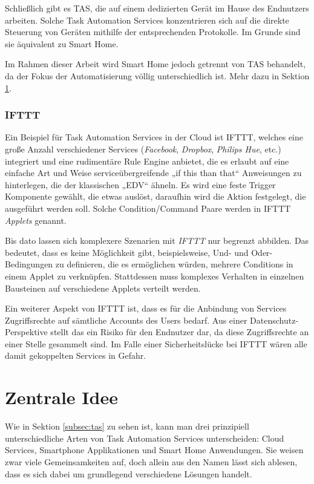 Schließlich gibt es TAS, die auf einem dedizierten Gerät im Hause des Endnutzers arbeiten. Solche Task Automation Services konzentrieren sich auf die direkte Steuerung von Geräten mithilfe der entsprechenden Protokolle. Im Grunde sind sie äquivalent zu Smart Home. 

Im Rahmen dieser Arbeit wird Smart Home jedoch getrennt von TAS behandelt, da der Fokus der Automatisierung völlig unterschiedlich ist. Mehr dazu in Sektion \ref{sec:idee}.



\subsubsection{IFTTT}
Ein Beispiel für Task Automation Services in der Cloud ist IFTTT, welches eine große Anzahl verschiedener Services (\textit{Facebook}, \textit{Dropbox}, \textit{Philips Hue}\cite{hue},   etc.) integriert und eine rudimentäre Rule Engine anbietet, die es erlaubt auf eine einfache Art und Weise serviceübergreifende „if this than that“ Anweisungen zu hinterlegen, die der klassischen „EDV“ ähneln. Es wird eine feste Trigger Komponente gewählt, die etwas auslöst, daraufhin wird die Aktion festgelegt, die ausgeführt werden soll. Solche Condition/Command Paare werden in IFTTT \textit{Applets} genannt. 

Bis dato lassen sich komplexere Szenarien mit \textit{IFTTT} nur begrenzt abbilden. Das bedeutet, dass es keine Möglichkeit gibt, beispielsweise, Und- und Oder-Bedingungen zu definieren, die es ermöglichen würden, mehrere Conditions in einem Applet zu verknüpfen. Stattdessen muss komplexes Verhalten in einzelnen Bausteinen auf verschiedene Applets verteilt werden.

Ein weiterer Aspekt von IFTTT ist, dass es für die Anbindung von Services Zugriffsrechte auf sämtliche Accounts des Users bedarf. Aus einer Datenschutz-Perspektive\cite{cloudsec} stellt das ein Risiko für den Endnutzer dar, da diese Zugriffsrechte an einer Stelle gesammelt sind. Im Falle einer Sicherheitslücke bei IFTTT wären alle damit gekoppelten Services in Gefahr. 

\section{Zentrale Idee}
\label{sec:idee}
Wie in Sektion \ref{subsec:tas} zu sehen ist, kann man drei prinzipiell unterschiedliche Arten von Task Automation Services unterscheiden: Cloud Services, Smartphone Applikationen und Smart Home Anwendungen. Sie weisen zwar viele Gemeinsamkeiten auf, doch allein aus den Namen lässt sich ablesen, dass es sich dabei um grundlegend verschiedene Lösungen handelt. 

